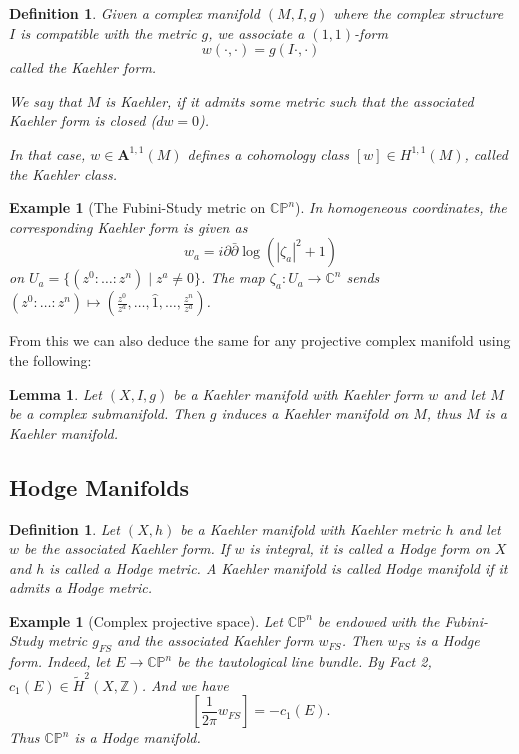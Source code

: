 \documentclass[12pt]{article}
\theoremstyle{darkgreentheorem}
\newtheorem{lm}[thm]{Lemma}
\theoremstyle{darkbluedefinition}
\newtheorem{defn}[thm]{Definition}
\theoremstyle{darkredexample}
\newtheorem{exa}[thm]{Example}
\theoremstyle{remark}
\newcommand{\Z}{\mathbb{Z}}
\newcommand{\1}{\mathbbm{1}}
\newcommand{\C}{\mathbb{C}}
\newcommand{\CP}{\mathbb{CP}}
\newcommand{\A}{\mathbf{A}}
\begin{document}
\begin{defn}
    Given a complex manifold $(M,I,g)$ where the complex structure $I$ is compatible with the metric $g$, we associate a $(1,1)$-form
    \[ w(\cdot,\cdot)=g(I\cdot,\cdot) \]
    called the \textit{Kaehler form}.

    We say that $M$ is Kaehler, if it admits some metric such that the associated Kaehler form is closed ($dw=0$).

    In that case, $w\in \A^{1,1}(M)$ defines a cohomology class $[w]\in H^{1,1}(M)$, called the \textit{Kaehler class}.
\end{defn}

\begin{exa}[The Fubini-Study metric on $\CP^{n}$]
    In homogeneous coordinates, the corresponding Kaehler form is given as
    \[ w_{a}=i\partial \bar{\partial}\log(|\zeta_{a}|^{2}+1) \]
    on $U_{a}=\{(z^{0}:\ldots:z^{n})\mid z^{a}\neq 0\}$.
    The map $\zeta_{a}\colon U_{a}\to \C^{n}$ sends $(z^{0}:\ldots:z^{n})\mapsto (\frac{z^{0}}{z^{a}},\ldots,\hat{1},\ldots,\frac{z^{n}}{z^{a}})$.
\end{exa}

From this we can also deduce the same for any projective complex manifold using the following:

\begin{lm}
    Let $(X,I,g)$ be a Kaehler manifold with Kaehler form $w$ and let $M$ be a complex submanifold.
    Then $g$ induces a Kaehler manifold on $M$, thus $M$ is a Kaehler manifold.
\end{lm}

\subsection{Hodge Manifolds}

\begin{defn}
    Let $(X,h)$ be a Kaehler manifold with Kaehler metric $h$ and let $w$ be the associated Kaehler form.
    If $w$ is integral, it is called a \textit{Hodge form} on $X$ and $h$ is called a \textit{Hodge metric}.
    A Kaehler manifold is called \textit{Hodge manifold} if it admits a Hodge metric.
\end{defn}

\begin{exa}[Complex projective space]
    Let $\CP^{n}$ be endowed with the Fubini-Study metric $g_{FS}$ and the associated Kaehler form $w_{FS}$.
    Then $w_{FS}$ is a Hodge form.
    Indeed, let $E\to \CP^{n}$ be the tautological line bundle.
    By Fact 2, $c_{1}(E)\in \tilde{H}^{2}(X,\Z)$.
    And we have
    \[ \left[\frac{1}{2\pi} w_{FS}\right] =-c_{1}(E).\]
    Thus $\CP^{n}$ is a Hodge manifold.
\end{exa}
\end{document}
